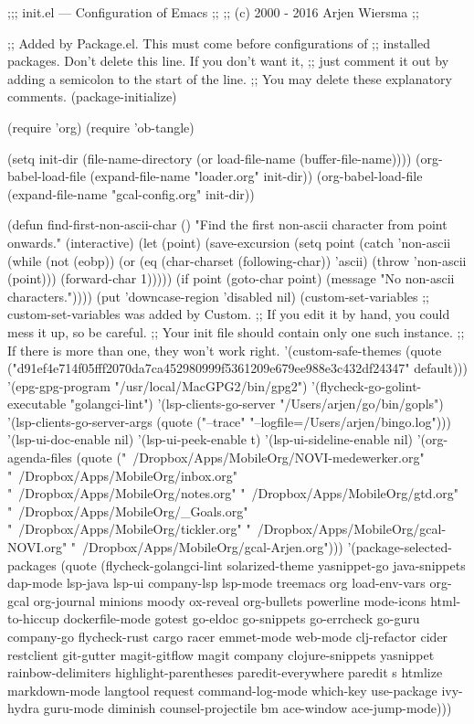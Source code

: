 ;;; init.el --- Configuration of Emacs
;;
;; (c) 2000 - 2016 Arjen Wiersma
;;

;; Added by Package.el.  This must come before configurations of
;; installed packages.  Don't delete this line.  If you don't want it,
;; just comment it out by adding a semicolon to the start of the line.
;; You may delete these explanatory comments.
(package-initialize)

(require 'org)
(require 'ob-tangle)

(setq init-dir (file-name-directory (or load-file-name (buffer-file-name))))
(org-babel-load-file (expand-file-name "loader.org" init-dir))
(org-babel-load-file (expand-file-name "gcal-config.org" init-dir))

(defun find-first-non-ascii-char ()
  "Find the first non-ascii character from point onwards."
  (interactive)
  (let (point)
    (save-excursion
      (setq point
            (catch 'non-ascii
              (while (not (eobp))
                (or (eq (char-charset (following-char))
                        'ascii)
                    (throw 'non-ascii (point)))
                (forward-char 1)))))
    (if point
        (goto-char point)
        (message "No non-ascii characters."))))
(put 'downcase-region 'disabled nil)
(custom-set-variables
 ;; custom-set-variables was added by Custom.
 ;; If you edit it by hand, you could mess it up, so be careful.
 ;; Your init file should contain only one such instance.
 ;; If there is more than one, they won't work right.
 '(custom-safe-themes
   (quote
	("d91ef4e714f05fff2070da7ca452980999f5361209e679ee988e3c432df24347" default)))
 '(epg-gpg-program "/usr/local/MacGPG2/bin/gpg2")
 '(flycheck-go-golint-executable "golangci-lint")
 '(lsp-clients-go-server "/Users/arjen/go/bin/gopls")
 '(lsp-clients-go-server-args (quote ("--trace" "--logfile=/Users/arjen/bingo.log")))
 '(lsp-ui-doc-enable nil)
 '(lsp-ui-peek-enable t)
 '(lsp-ui-sideline-enable nil)
 '(org-agenda-files
   (quote
	("~/Dropbox/Apps/MobileOrg/NOVI-medewerker.org" "~/Dropbox/Apps/MobileOrg/inbox.org" "~/Dropbox/Apps/MobileOrg/notes.org" "~/Dropbox/Apps/MobileOrg/gtd.org" "~/Dropbox/Apps/MobileOrg/_Goals.org" "~/Dropbox/Apps/MobileOrg/tickler.org" "~/Dropbox/Apps/MobileOrg/gcal-NOVI.org" "~/Dropbox/Apps/MobileOrg/gcal-Arjen.org")))
 '(package-selected-packages
   (quote
	(flycheck-golangci-lint solarized-theme yasnippet-go java-snippets dap-mode lsp-java lsp-ui company-lsp lsp-mode treemacs org load-env-vars org-gcal org-journal minions moody ox-reveal org-bullets powerline mode-icons html-to-hiccup dockerfile-mode gotest go-eldoc go-snippets go-errcheck go-guru company-go flycheck-rust cargo racer emmet-mode web-mode clj-refactor cider restclient git-gutter magit-gitflow magit company clojure-snippets yasnippet rainbow-delimiters highlight-parentheses paredit-everywhere paredit s htmlize markdown-mode langtool request command-log-mode which-key use-package ivy-hydra guru-mode diminish counsel-projectile bm ace-window ace-jump-mode)))
